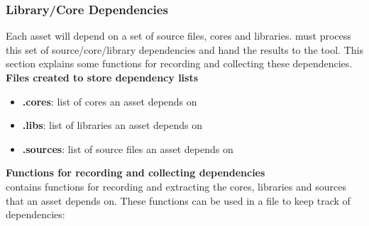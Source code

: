 \subsubsection{Library/Core Dependencies}
\label{depends}
Each asset will depend on a set of source files, cores and libraries.   must process this set of source/core/library dependencies and hand the results to the tool.  This section explains some functions for recording and collecting these dependencies.
\\\textbf{Files created to store dependency lists}\\
\begin{itemize}
\item \textbf{.cores}: list of cores an asset depends on
\item \textbf{.libs}: list of libraries an asset depends on
\item \textbf{.sources}: list of source files an asset depends on
\end{itemize}
\textbf{Functions for recording and collecting dependencies}\\
 contains functions for recording and extracting the cores, libraries and sources that an asset depends on. These functions can be used in a  file to keep track of dependencies:
